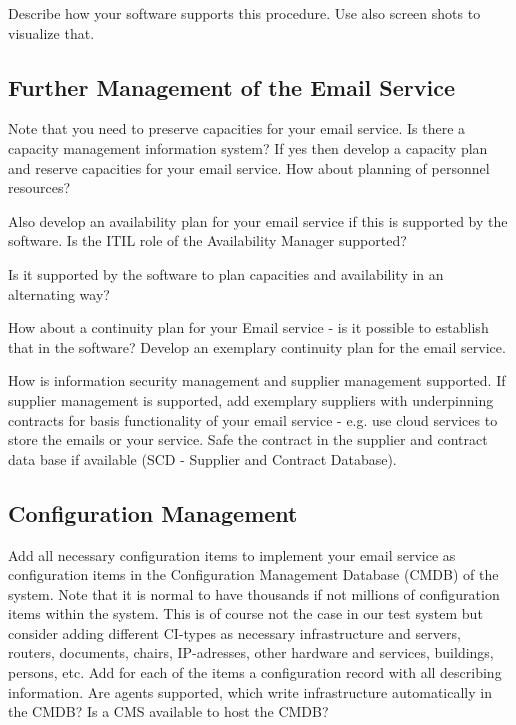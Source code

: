Describe how your software supports this procedure. Use also screen shots to visualize that.

\subsection{Further Management of the Email Service}
\label{sec:furtherManagement}

Note that you need to preserve capacities for your email service. Is there a capacity management information system? If yes then develop a capacity plan and  reserve capacities for your email service. How about planning of personnel resources?

Also develop an availability plan for your email service if this is supported by the software. Is the ITIL role of the Availability Manager supported?

Is it supported by the software to plan capacities and availability in an alternating way?

How about a continuity plan for your Email service - is it possible to establish that in the software? Develop an exemplary continuity plan for the email service.

How is information security management and supplier management supported. If supplier management is supported, add exemplary suppliers with underpinning contracts for basis functionality of your email service - e.g. use cloud services to store the emails or your service. Safe the contract in the supplier and contract data base if available (SCD - Supplier and Contract Database).

\subsection{Configuration Management}
\label{sec:configurationManagement}

Add all necessary configuration items to implement your email service as configuration items in the Configuration Management Database (CMDB) of the system. Note that it is normal to have thousands if not millions of configuration items within the system. This is of course not the case in our test system but consider adding different CI-types as necessary infrastructure and servers, routers, documents, chairs, IP-adresses, other hardware and services, buildings, persons, etc. Add for each of the items a configuration record with all describing information. Are agents supported, which write infrastructure automatically in the CMDB? Is a CMS available to host the CMDB?

